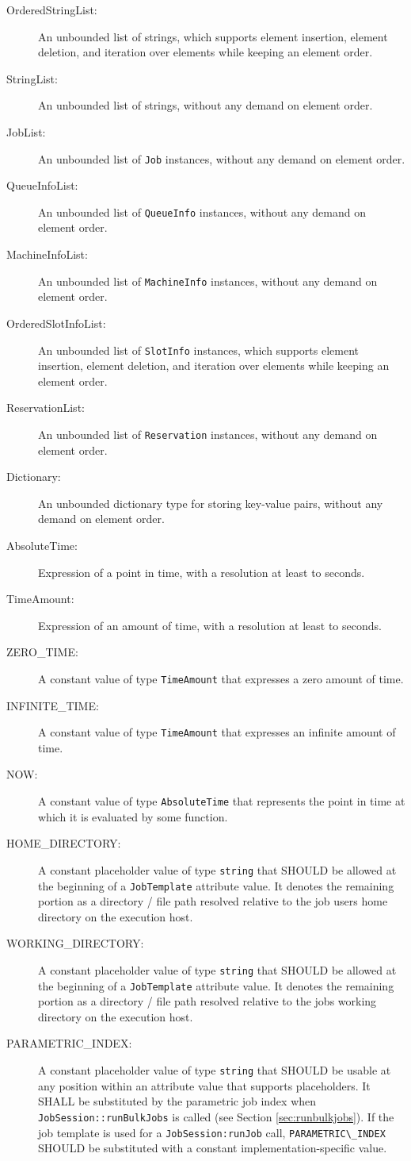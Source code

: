 \documentclass{article}
\newcommand{\h}[1]{\lstinline|#1|}
\begin{document}
\begin{description}
\item[OrderedStringList:] An unbounded list of strings, which supports element insertion, element deletion, and iteration over elements while keeping an element order.
\item[StringList:] An unbounded list of strings, without any demand on element order.
\item[JobList:] An unbounded list of \h{Job} instances, without any demand on element order.
\item[QueueInfoList:] An unbounded list of \h{QueueInfo} instances, without any demand on element order.
\item[MachineInfoList:] An unbounded list of \h{MachineInfo} instances, without any demand on element order.
\item[OrderedSlotInfoList:] An unbounded list of \h{SlotInfo} instances, which supports element insertion, element deletion, and iteration over elements while keeping an element order.
\item[ReservationList:] An unbounded list of \h{Reservation} instances, without any demand on element order.
\item[Dictionary:] An unbounded dictionary type for storing key-value pairs, without any demand on element order.
\item[AbsoluteTime:] Expression of a point in time, with a resolution at least to seconds.
\item[TimeAmount:] Expression of an amount of time, with a resolution at least to seconds.
\item[ZERO\_TIME:] A constant value of type \h{TimeAmount} that expresses a zero amount of time.
\item[INFINITE\_TIME:] A constant value of type \h{TimeAmount} that expresses an infinite amount of time.
\item[NOW:] A constant value of type \h{AbsoluteTime} that represents the point in time at which it is evaluated by some function.
\item[HOME\_DIRECTORY:] A constant placeholder value of type \h{string} that SHOULD be allowed at the beginning of a \h{JobTemplate} attribute value. It denotes the remaining portion as a directory / file path resolved relative to the job users home directory on the execution host.
\item[WORKING\_DIRECTORY:] A constant placeholder value of type \h{string} that SHOULD be allowed at the beginning of a \h{JobTemplate} attribute value. It denotes the remaining portion as a directory / file path resolved relative to the jobs working directory on the execution host.
\item[PARAMETRIC\_INDEX:] A constant placeholder value of type \h{string} that SHOULD be usable at any position within an attribute value that supports placeholders. It SHALL be substituted by the parametric job index when \h{JobSession::runBulkJobs} is called (see Section \ref{sec:runbulkjobs}). If the job template is used for a \h{JobSession:runJob} call, \h{PARAMETRIC\_INDEX} SHOULD be substituted with a constant implementation-specific value.
\end{description}
\end{document}
